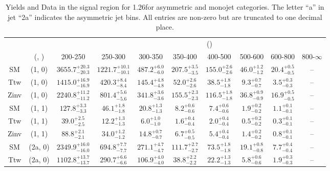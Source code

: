 \begin{table}[h!]
\tiny
\centering
\caption{Yields and Data in the signal region for 1.26\ifb for asymmetric and monojet categories. The letter ``a'' in jet \eg ``2a''  indicates the asymmetric jet bins. All entries are non-zero but are truncated to one decimal place.\label{tab:yieldsnodata_sig_comb_asym}}
\begin{tabular}
{cccccccccc}
	\hline\hline
&	&	& \multicolumn{8}{c}{\scalht (\gev)}\\ 
	&	 (\njet, \nb) & 200-250 & 250-300 & 300-350 & 350-400 & 400-500 & 500-600 & 600-800 & 800-$\infty$ \\ [0.8ex] 
\hline
	SM & (1, 0) & $3655.7^{+ 20.3 }_{- 20.3 }$ & $1221.7^{+ 10.1 }_{- 10.1 }$ & $487.2^{+ 6.0 }_{- 6.0 }$ & $207.5^{+ 3.5 }_{- 3.5 }$ & $155.0^{+ 2.6 }_{- 2.6 }$ & $46.0^{+ 1.2 }_{- 1.2 }$ & $20.4^{+ 0.5 }_{- 0.5 }$ & -- \\[0.5ex] 
	Ttw & (1, 0) & $1415.0^{+ 16.9 }_{- 16.9 }$ & $420.3^{+ 8.4 }_{- 8.4 }$ & $145.4^{+ 4.8 }_{- 4.8 }$ & $52.0^{+ 2.6 }_{- 2.6 }$ & $38.5^{+ 1.8 }_{- 1.8 }$ & $9.3^{+ 0.7 }_{- 0.7 }$ & $3.5^{+ 0.3 }_{- 0.3 }$ & -- \\[0.5ex] 
	Zinv & (1, 0) & $2240.8^{+ 11.2 }_{- 11.2 }$ & $801.4^{+ 5.6 }_{- 5.6 }$ & $341.8^{+ 3.6 }_{- 3.6 }$ & $155.5^{+ 2.3 }_{- 2.3 }$ & $116.5^{+ 1.8 }_{- 1.8 }$ & $36.8^{+ 0.9 }_{- 0.9 }$ & $16.9^{+ 0.5 }_{- 0.5 }$ & -- \\[0.5ex] 
	SM & (1, 1) & $127.8^{+ 3.3 }_{- 3.3 }$ & $46.1^{+ 1.8 }_{- 1.8 }$ & $20.8^{+ 1.3 }_{- 1.3 }$ & $8.2^{+ 0.6 }_{- 0.6 }$ & $7.4^{+ 0.6 }_{- 0.6 }$ & $1.9^{+ 0.2 }_{- 0.2 }$ & $1.1^{+ 0.1 }_{- 0.1 }$ & -- \\[0.5ex] 
	Ttw & (1, 1) & $39.0^{+ 2.5 }_{- 2.5 }$ & $12.2^{+ 1.3 }_{- 1.3 }$ & $6.0^{+ 1.0 }_{- 1.0 }$ & $1.6^{+ 0.4 }_{- 0.4 }$ & $2.0^{+ 0.4 }_{- 0.4 }$ & $0.5^{+ 0.2 }_{- 0.2 }$ & $0.3^{+ 0.1 }_{- 0.1 }$ & -- \\[0.5ex] 
	Zinv & (1, 1) & $88.8^{+ 2.1 }_{- 2.1 }$ & $34.0^{+ 1.2 }_{- 1.2 }$ & $14.8^{+ 0.7 }_{- 0.7 }$ & $6.7^{+ 0.5 }_{- 0.5 }$ & $5.4^{+ 0.4 }_{- 0.4 }$ & $1.4^{+ 0.2 }_{- 0.2 }$ & $0.8^{+ 0.1 }_{- 0.1 }$ & -- \\[0.5ex] 
	SM & (2a, 0) & $2349.9^{+ 16.0 }_{- 16.0 }$ & $694.8^{+ 7.7 }_{- 7.7 }$ & $271.1^{+ 4.7 }_{- 4.7 }$ & $111.7^{+ 2.7 }_{- 2.7 }$ & $73.5^{+ 1.8 }_{- 1.8 }$ & $19.1^{+ 0.8 }_{- 0.8 }$ & $7.7^{+ 0.4 }_{- 0.4 }$ & -- \\[0.5ex] 
	Ttw & (2a, 0) & $1102.8^{+ 13.7 }_{- 13.7 }$ & $290.7^{+ 6.6 }_{- 6.6 }$ & $106.9^{+ 4.0 }_{- 4.0 }$ & $38.8^{+ 2.2 }_{- 2.2 }$ & $22.2^{+ 1.3 }_{- 1.3 }$ & $5.8^{+ 0.6 }_{- 0.6 }$ & $1.9^{+ 0.3 }_{- 0.3 }$ & -- \\[0.5ex] 

\end{tabular}
\end{table}
